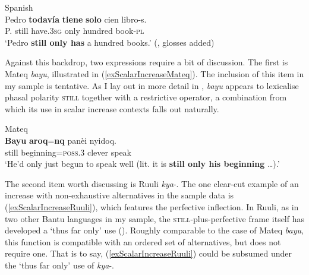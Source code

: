 \begin{exe}
	\ex Spanish\label{exScalarIncreaseSpanishBooks}\\
	\gll Pedro \textbf{todavía} \textbf{tiene} \textbf{solo} cien libro-s.\\
	P. still have.3\textsc{sg} only hundred book-\textsc{pl}\\
	\glt \lq Pedro \textbf{still only has} a hundred books.' (\cite[383]{Garrido1992},  glosses added)
\end{exe}

Against this backdrop, two expressions require a bit of discussion. The first is Mateq \textit{bayu}, illustrated in (\ref{exScalarIncreaseMateq}). The inclusion of this item in my sample is tentative. As I lay out in more detail in , \textit{bayu} appears to lexicalise phasal polarity \textsc{still} together with a restrictive operator, a combination from which its use in scalar increase contexts falls out naturally.

\begin{exe}
	\ex Mateq\label{exScalarIncreaseMateq}\\
	\gll \textbf{Bayu} \textbf{aroq}=\textbf{nq} panèi nyidoq.\\
	still beginning=\textsc{poss}.3 clever speak\\
	\glt \lq He'd only just begun to speak well (lit. it is \textbf{still only his beginning} …).' \parencite[138]{Connell2013}	
\end{exe}

The second item worth discussing is Ruuli \mbox{\textit{kya}-}. The one clear-cut example of an increase with non-exhaustive alternatives in the sample data is (\ref{exScalarIncreaseRuuli}), which features the perfective  inflection. In Ruuli, as in two other Bantu languages in my sample, the \textsc{still}-plus-perfective frame itself has developed a \lq thus far only\rq{ }use (). Roughly comparable to the case of Mateq \textit{bayu}, this function is compatible with an ordered set of alternatives, but does not require one. That is to say, (\ref{exScalarIncreaseRuuli}) could be subsumed under the \lq thus far only\rq{ }use of \mbox{\textit{kya}-}.

